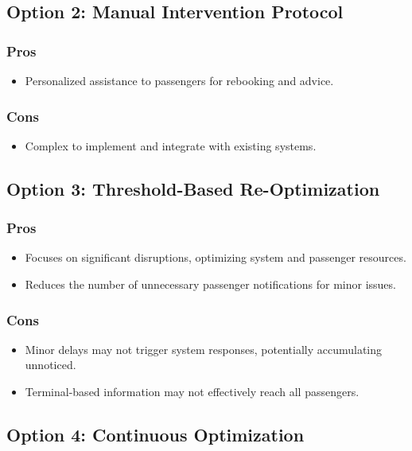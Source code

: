\subsection*{Option 2: Manual Intervention Protocol}
\subsubsection*{Pros}
\begin{itemize}
    \item Personalized assistance to passengers for rebooking and advice.
\end{itemize}
\subsubsection*{Cons}
\begin{itemize}
    \item Complex to implement and integrate with existing systems.
\end{itemize}

\subsection*{Option 3: Threshold-Based Re-Optimization}
\subsubsection*{Pros}
\begin{itemize}
    \item Focuses on significant disruptions, optimizing system and passenger resources.
    \item Reduces the number of unnecessary passenger notifications for minor issues.
\end{itemize}
\subsubsection*{Cons}
\begin{itemize}
    \item Minor delays may not trigger system responses, potentially accumulating unnoticed.
    \item Terminal-based information may not effectively reach all passengers.
\end{itemize}

\subsection*{Option 4: Continuous Optimization}
